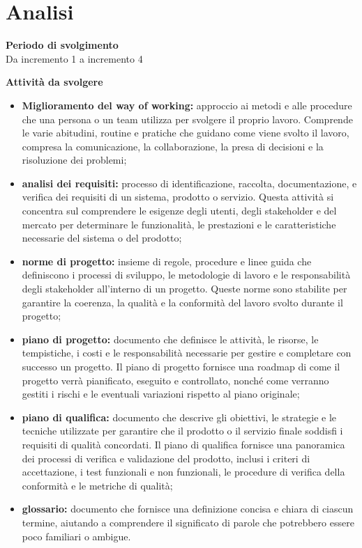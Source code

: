 \section{Analisi}

\textbf{Periodo di svolgimento}
\\ Da incremento 1 a incremento 4

\textbf{Attività da svolgere}
    \begin{itemize}
        \item \textbf{Miglioramento del way of working:} approccio ai metodi e alle procedure che una persona o un team utilizza per svolgere il proprio lavoro. Comprende le varie abitudini, routine e pratiche che guidano come viene svolto il lavoro, compresa la comunicazione, la collaborazione, la presa di decisioni e la risoluzione dei problemi;
        \item \textbf{analisi dei requisiti:} processo di identificazione, raccolta, documentazione, e verifica dei requisiti di un sistema, prodotto o servizio. Questa attività si concentra sul comprendere le esigenze degli utenti, degli stakeholder e del mercato per determinare le funzionalità, le prestazioni e le caratteristiche necessarie del sistema o del prodotto;
        \item \textbf{norme di progetto:} insieme di regole, procedure e linee guida che definiscono i processi di sviluppo, le metodologie di lavoro e le responsabilità degli stakeholder all'interno di un progetto. Queste norme sono stabilite per garantire la coerenza, la qualità e la conformità del lavoro svolto durante il progetto;
        \item \textbf{piano di progetto:} documento che definisce le attività, le risorse, le tempistiche, i costi e le responsabilità necessarie per gestire e completare con successo un progetto. Il piano di progetto fornisce una roadmap di come il progetto verrà pianificato, eseguito e controllato, nonché come verranno gestiti i rischi e le eventuali variazioni rispetto al piano originale;
        \item \textbf{piano di qualifica:} documento che descrive gli obiettivi, le strategie e le tecniche utilizzate per garantire che il prodotto o il servizio finale soddisfi i requisiti di qualità concordati. Il piano di qualifica fornisce una panoramica dei processi di verifica e validazione del prodotto, inclusi i criteri di accettazione, i test funzionali e non funzionali, le procedure di verifica della conformità e le metriche di qualità;
        \item \textbf{glossario:} documento che fornisce una definizione concisa e chiara di ciascun termine, aiutando a comprendere il significato di parole che potrebbero essere poco familiari o ambigue.
    \end{itemize}

